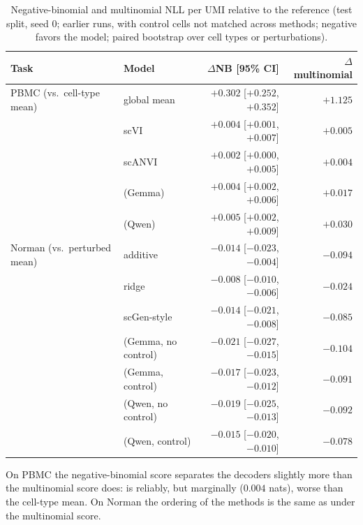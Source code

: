 \begin{table}[!htb]
\centering
\scriptsize
\begin{tabular}{llrr}
\toprule
Task & Model & $\Delta$NB [95\% CI] & $\Delta$multinomial \\
\midrule
PBMC (vs.\ cell-type mean) & global mean & $+0.302$ [$+0.252$, $+0.352$] & $+1.125$ \\
 & scVI & $+0.004$ [$+0.001$, $+0.007$] & $+0.005$ \\
 & scANVI & $+0.002$ [$+0.000$, $+0.005$] & $+0.004$ \\
 & \cadc{} (Gemma) & $+0.004$ [$+0.002$, $+0.006$] & $+0.017$ \\
 & \cadc{} (Qwen) & $+0.005$ [$+0.002$, $+0.009$] & $+0.030$ \\
\midrule
Norman (vs.\ perturbed mean) & additive & $-0.014$ [$-0.023$, $-0.004$] & $-0.094$ \\
 & ridge & $-0.008$ [$-0.010$, $-0.006$] & $-0.024$ \\
 & scGen-style & $-0.014$ [$-0.021$, $-0.008$] & $-0.085$ \\
 & \cadc{} (Gemma, no control) & $-0.021$ [$-0.027$, $-0.015$] & $-0.104$ \\
 & \cadc{} (Gemma, control) & $-0.017$ [$-0.023$, $-0.012$] & $-0.091$ \\
 & \cadc{} (Qwen, no control) & $-0.019$ [$-0.025$, $-0.013$] & $-0.092$ \\
 & \cadc{} (Qwen, control) & $-0.015$ [$-0.020$, $-0.010$] & $-0.078$ \\
\bottomrule
\end{tabular}
\caption{Negative-binomial and multinomial NLL per UMI relative to the reference (test split, seed 0; earlier runs, with control cells not matched across methods; negative favors the model; paired bootstrap over cell types or perturbations).}
\label{tab:nb}
\end{table}

On PBMC the negative-binomial score separates the decoders slightly more than the multinomial score does: \cadc{} is reliably, but marginally ($0.004$ nats), worse than the cell-type mean.
On Norman the ordering of the methods is the same as under the multinomial score.

\FloatBarrier
